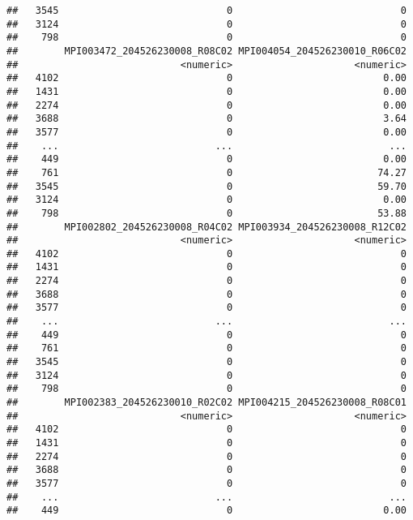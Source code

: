 \documentclass[
]{article}
\begin{document}
\begin{verbatim}
##   3545                             0                             0
##   3124                             0                             0
##    798                             0                             0
##        MPI003472_204526230008_R08C02 MPI004054_204526230010_R06C02
##                            <numeric>                     <numeric>
##   4102                             0                          0.00
##   1431                             0                          0.00
##   2274                             0                          0.00
##   3688                             0                          3.64
##   3577                             0                          0.00
##    ...                           ...                           ...
##    449                             0                          0.00
##    761                             0                         74.27
##   3545                             0                         59.70
##   3124                             0                          0.00
##    798                             0                         53.88
##        MPI002802_204526230008_R04C02 MPI003934_204526230008_R12C02
##                            <numeric>                     <numeric>
##   4102                             0                             0
##   1431                             0                             0
##   2274                             0                             0
##   3688                             0                             0
##   3577                             0                             0
##    ...                           ...                           ...
##    449                             0                             0
##    761                             0                             0
##   3545                             0                             0
##   3124                             0                             0
##    798                             0                             0
##        MPI002383_204526230010_R02C02 MPI004215_204526230008_R08C01
##                            <numeric>                     <numeric>
##   4102                             0                             0
##   1431                             0                             0
##   2274                             0                             0
##   3688                             0                             0
##   3577                             0                             0
##    ...                           ...                           ...
##    449                             0                          0.00

\end{verbatim}
\end{document}
